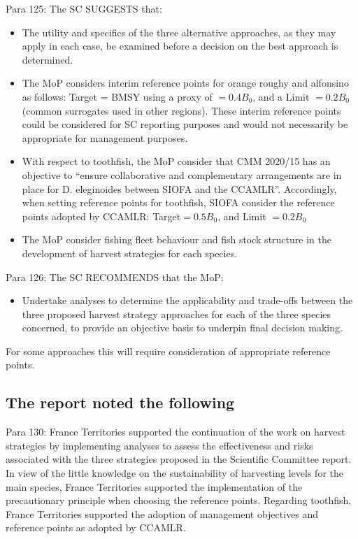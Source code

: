 Para 125: The SC SUGGESTS that:
\begin{itemize}
	\item The utility and specifics of the three alternative approaches, as they may apply in each case, be examined before a decision on the best approach is determined.
	\item The MoP considers interim reference points for orange roughy and alfonsino as follows: Target = BMSY using a proxy of $= 0.4 B_0$, and a Limit $=0.2 B_0$ (common surrogates used in other regions). These interim reference points could be considered for SC reporting purposes and would not necessarily be appropriate for management purposes.
	\item With respect to toothfish, the MoP consider that CMM 2020/15 has an objective to “ensure collaborative and complementary arrangements are in place for D. eleginoides between SIOFA and the CCAMLR”. Accordingly, when setting reference points for toothfish, SIOFA consider the reference points adopted by CCAMLR: Target$= 0.5 B_0$, and Limit $=0.2 B_0$
	\item The MoP consider fishing fleet behaviour and fish stock structure in the development of harvest strategies for each species.
\end{itemize}

Para 126: The SC RECOMMENDS that the MoP:
\begin{itemize}
	\item Undertake analyses to determine the applicability and trade-offs between the three proposed harvest strategy approaches for each of the three species concerned, to provide an objective basis to underpin final decision making. \end{itemize}
For some approaches this will require consideration of appropriate reference points.

\subsection{The \cite{MoP8} report noted the following}

Para 130: France Territories supported the continuation of the work on harvest strategies by implementing analyses to assess the effectiveness and risks associated with the three strategies proposed in the Scientific Committee report. In view of the little knowledge on the sustainability of harvesting levels for the main species, France Territories supported the implementation of the precautionary principle when choosing the reference points. Regarding toothfish, France Territories supported the adoption of management objectives and reference points as adopted by CCAMLR.


